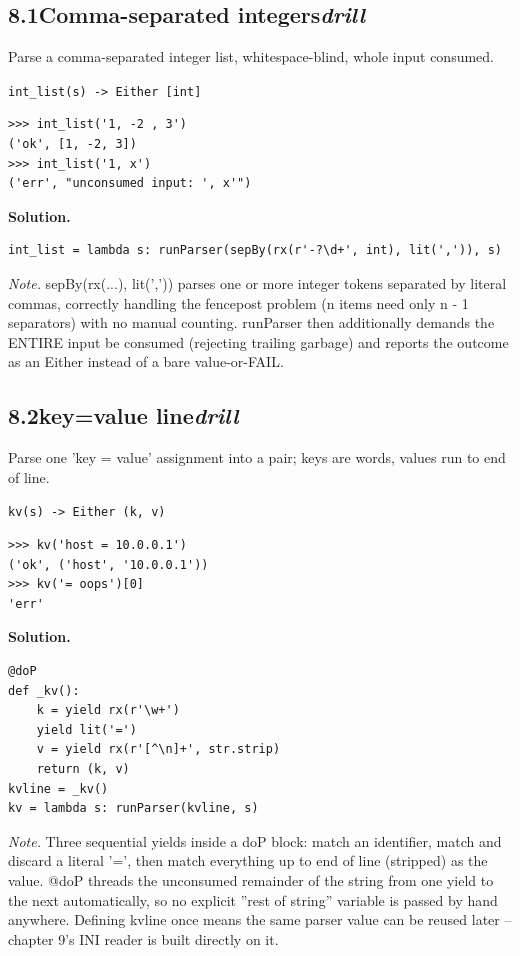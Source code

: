 \documentclass[10pt,letterpaper]{book}
\begin{document}
\subsection*{8.1\quad Comma-separated integers\hfill\textnormal{\textit{drill}}}
Parse a comma-separated integer list, whitespace-blind, whole input consumed.

\noindent\texttt{int\_list(s) -> Either [int]}
\begin{lstlisting}[style=ex]
>>> int_list('1, -2 , 3')
('ok', [1, -2, 3])
>>> int_list('1, x')
('err', "unconsumed input: ', x'")
\end{lstlisting}
\noindent\textbf{Solution.}
\begin{lstlisting}[style=code]
int_list = lambda s: runParser(sepBy(rx(r'-?\d+', int), lit(',')), s)
\end{lstlisting}
\noindent\textit{Note.} sepBy(rx(...), lit(',')) parses one or more integer tokens separated by literal commas, correctly handling the fencepost problem (n items need only n - 1 separators) with no manual counting. runParser then additionally demands the ENTIRE input be consumed (rejecting trailing garbage) and reports the outcome as an Either instead of a bare value-or-FAIL.

\subsection*{8.2\quad key=value line\hfill\textnormal{\textit{drill}}}
Parse one 'key = value' assignment into a pair; keys are words, values run to end of line.

\noindent\texttt{kv(s) -> Either (k, v)}
\begin{lstlisting}[style=ex]
>>> kv('host = 10.0.0.1')
('ok', ('host', '10.0.0.1'))
>>> kv('= oops')[0]
'err'
\end{lstlisting}
\noindent\textbf{Solution.}
\begin{lstlisting}[style=code]
@doP
def _kv():
    k = yield rx(r'\w+')
    yield lit('=')
    v = yield rx(r'[^\n]+', str.strip)
    return (k, v)
kvline = _kv()
kv = lambda s: runParser(kvline, s)
\end{lstlisting}
\noindent\textit{Note.} Three sequential yields inside a doP block: match an identifier, match and discard a literal '=', then match everything up to end of line (stripped) as the value. @doP threads the unconsumed remainder of the string from one yield to the next automatically, so no explicit ''rest of string'' variable is passed by hand anywhere. Defining kvline once means the same parser value can be reused later -- chapter 9's INI reader is built directly on it.
\end{document}
